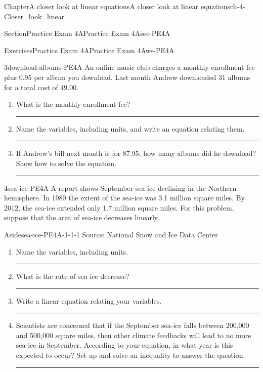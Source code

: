 \documentclass[twoside,11pt,]{book}
\newlength{\workspacestrutwidth}
\numberwithin{equation}{section}
\begin{document}
\begin{chapterptx}{Chapter}{A closer look at linear equations}{}{A closer look at linear equations}{}{}{ch-4-Closer_look_linear}
\begin{sectionptx}{Section}{Practice Exam 4A}{}{Practice Exam 4A}{}{}{sec-PE4A}
\begin{exercises-subsection-numberless}{Exercises}{Practice Exam 4A}{}{Practice Exam 4A}{}{}{ws-PE4A}
\clearpage
\begin{divisionexercise}{3}{}{}{download-albums-PE4A}%
An online music club charges a monthly enrollment fee plus \textdollar{}0.95 per album you download. Last month Andrew downloaded 31 albums for a total cost of \textdollar{}49.00.%
\begin{enumerate}[label=(\alph*),ref=\alph*]%
\item{}What is the monthly enrollment fee?%
\par\rule{\workspacestrutwidth}{2in}%
\item{}Name the variables, including units, and write an equation relating them.%
\par\rule{\workspacestrutwidth}{2in}%
\item{}If Andrew's bill next month is for \textdollar{}87.95, how many albums did he download? Show how to solve the equation.%
\par\rule{\workspacestrutwidth}{2in}%
\end{enumerate}%
\end{divisionexercise}%
\clearpage
\begin{divisionexercise}{4}{}{}{sea-ice-PE4A}%
A report shows September sea-ice declining in the Northern hemisphere. In 1980 the extent of the sea-ice was 3.1 million square miles. By 2012, the sea-ice extended only 1.7 million square miles. For this problem, suppose that the area of sea-ice decreases linearly. \begin{aside}{Aside}{}{sea-ice-PE4A-1-1-1}%
Source: National Snow and Ice Data Center%
\end{aside}
%
\begin{enumerate}[label=(\alph*),ref=\alph*]%
\item{}Name the variables, including units.%
\par\rule{\workspacestrutwidth}{1.4in}%
\item{}What is the rate of sea ice decrease?%
\par\rule{\workspacestrutwidth}{1.4in}%
\item{}Write a linear equation relating your variables.%
\par\rule{\workspacestrutwidth}{1.4in}%
\item{}Scientists are concerned that if the September sea-ice falls between 200,000 and 500,000 square miles, then other climate feedbacks will lead to no more sea-ice in September. According to your equation, in what year is this expected to occur? Set up and solve an inequality to answer the question.%
\par\rule{\workspacestrutwidth}{1.4in}%

\end{enumerate}
\end{divisionexercise}
\end{exercises-subsection-numberless}
\end{sectionptx}
\end{chapterptx}
\end{document}
